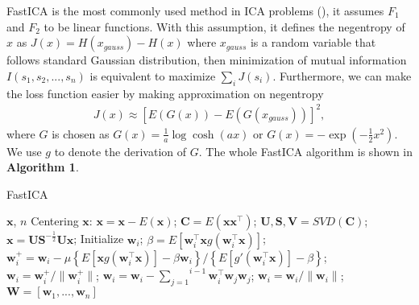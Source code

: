 \documentclass[twoside,11pt]{article}
\begin{document}
FastICA is the most commonly used method in ICA problems (\cite{hyvarinen1999fast}), it assumes $F_1$ and $F_2$ to be linear functions. With this assumption, it defines the negentropy of $x$ as $J(x)=H(x_{gauss})-H(x)$ where $x_{gauss}$ is a random variable that follows standard Gaussian distribution, then minimization of mutual information $I(s_1, s_2, ..., s_n)$ is equivalent to maximize $\underset{i}{\sum}J(s_i)$. Furthermore, we can make the loss function easier by making approximation on negentropy
\begin{align}
\label{ICA loss}
J(x)\approx \left[E(G(x))-E(G(x_{gauss}))\right]^2,
\end{align}
where $G$ is chosen as $G(x)=\frac{1}{a}\log\cosh(ax)$ or $G(x)=-\exp(-\frac{1}{2}x^2)$. We use $g$ to denote the derivation of $G$. The whole FastICA algorithm is shown in \textbf{Algorithm 1}.
\begin{algorithm}
\renewcommand{\algorithmicrequire}{\textbf{Input:}}
\renewcommand{\algorithmicensure}{\textbf{Output:}}
\caption{FastICA}
\label{FastICA}
\begin{algorithmic}[1]
\REQUIRE $\mathbf x$, $n$
\STATE Centering $\mathbf x$: $\mathbf x=\mathbf x-E(\mathbf x)$;
\STATE $\mathbf C=E(\mathbf x\mathbf x^\top)$;
\STATE $\mathbf U, \mathbf S, \mathbf V=SVD(\mathbf C)$;
\STATE $\mathbf x=\mathbf U\mathbf S^{-\frac12}\mathbf U\mathbf x$;
\STATE Initialize $\mathbf w_i$;
\STATE $\beta=E\left[\mathbf w_i^\top\mathbf xg(\mathbf w_i^\top\mathbf x)\right]$;
\STATE $\mathbf w_i^+=\mathbf w_i-\mu\left\{E\left[\mathbf xg(\mathbf w_i^\top\mathbf x)\right]-\beta\mathbf w_i\right\}\bigg/\left\{E\left[g'(\mathbf w_i^\top \mathbf x)\right]-\beta\right\}$;
\STATE $\mathbf w_i=\mathbf w_i^+\big/ \parallel \mathbf w_i^+ \parallel$;
\STATE $\mathbf w_i=\mathbf w_i-\overset{i-1}{\underset{j=1}{\sum}}\mathbf w_i^\top\mathbf w_j\mathbf w_j$;
\STATE $\mathbf w_i=\mathbf w_i\big/\parallel\mathbf w_i\parallel$;
\ENDIF
\ENDFOR
\ENSURE $\mathbf W=[\mathbf w_1, ..., \mathbf w_n]$
\end{algorithmic}
\end{algorithm}
\end{document}
